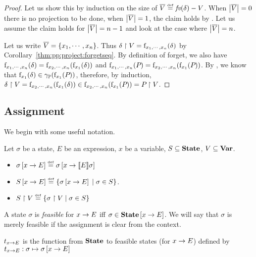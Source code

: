 \begin{proof} Let us show this by induction on the size of
$ \overline{V} \stackrel{\smash{\scriptscriptstyle \mathrm{def}}}= \textit{fv}(\delta) - V $. When $ \left| \overline{V} \right| = 0 $ there
is no projection to be done, when $ \left| \overline{V} \right| = 1 $, the claim
holds by . Let us assume the claim holds for
$ \left| \overline{V} \right| = n - 1 $ and look at the case where
$ \left| \overline{V} \right| = n $.

Let us write $ \overline{V} = \left\{ x_1, \cdots,
x_n \right\} $. Thus $ \delta \upharpoonright V = \mathrm{f}_{x_1, \cdots, x_n}(\delta)
$ by Corollary~\ref{thm:pp:project:forgetseq}. By definition of
forget, we also have $ \mathrm{f}_{x_1, \cdots, x_n}(\delta)
= \mathrm{f}_{x_2, \cdots, x_n}(\mathrm{f}_{x_1}(\delta)) $ and
$ \mathrm{f}_{x_1, \cdots, x_n}(P_{}) = \mathrm{f}_{x_2, \cdots,
x_n}(\mathrm{f}_{x_1}(P_{})) $. By , we know that
$ \mathrm{f}_{x_1}(\delta) \in \gamma_{\mathbb{P}}(\mathrm{f}_{x_1}(P_{})) $, therefore,
by induction, $ \delta \upharpoonright V = \mathrm{f}_{x_2, \cdots,
x_n}(\mathrm{f}_{x_1}(\delta)) \in \mathrm{f}_{x_2, \cdots,
x_n}(\mathrm{f}_{x_1}(P_{})) = P_{} \upharpoonright V $.
\end{proof}

\subsection{Assignment}
We begin with some useful notation. 
\begin{notation} Let $ \sigma $ be a state, $ E $
be an expression, $ x $ be a variable, $ S \subseteq \textbf{State} $, $
V \subseteq \textbf{Var} $.

\begin{itemize}
\item{}
$ \sigma \left[ x \rightarrow E \right] \stackrel{\smash{\scriptscriptstyle \mathrm{def}}}= \sigma \left[ x \rightarrow [\![{E}]\!]{\sigma} \right]
$
\item{} $ S \left[ x \rightarrow E \right]
\stackrel{\smash{\scriptscriptstyle \mathrm{def}}}= \left\{ \sigma \left[ x \rightarrow E \right] \;|\; \sigma \in S \right\} $.
\item{} $ S \upharpoonright V \stackrel{\smash{\scriptscriptstyle \mathrm{def}}}= \left\{ \sigma \upharpoonright V \;|\; \sigma \in S \right\} $
\end{itemize}
\end{notation}

\begin{definition} 
A state $ \sigma $ is \emph{feasible} for $ x \rightarrow E $ iff
$ \sigma \in \textbf{State} \left[ x \rightarrow E \right] $. We will say that $ \sigma $
is merely feasible if the assignment is clear from the context.
\end{definition}

\begin{definition} $ t_{x \rightarrow E} $ is the function from $ \textbf{State}
$ to feasible states (for $ x \rightarrow E $) defined by
$ t_{x \rightarrow E} : \sigma \mapsto \sigma \left[ x \rightarrow E \right] $
\end{definition}

